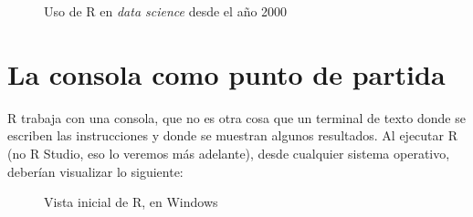 \documentclass[letterpaper,11pt]{article}
\begin{document}
\begin{figure}[H]
\centering
{}
\caption{Uso de R en \emph{data science} desde el año 2000}
\end{figure}

\section{La consola como punto de partida}

R trabaja con una consola, que no es otra cosa que un terminal de texto donde se escriben las instrucciones y donde se muestran algunos resultados. Al ejecutar R (no R Studio, eso lo veremos más adelante), desde cualquier sistema operativo, deberían visualizar lo siguiente:

\begin{figure}[H]
	\centering
	\caption{Vista inicial de R, en Windows}
\end{figure}
\end{document}
